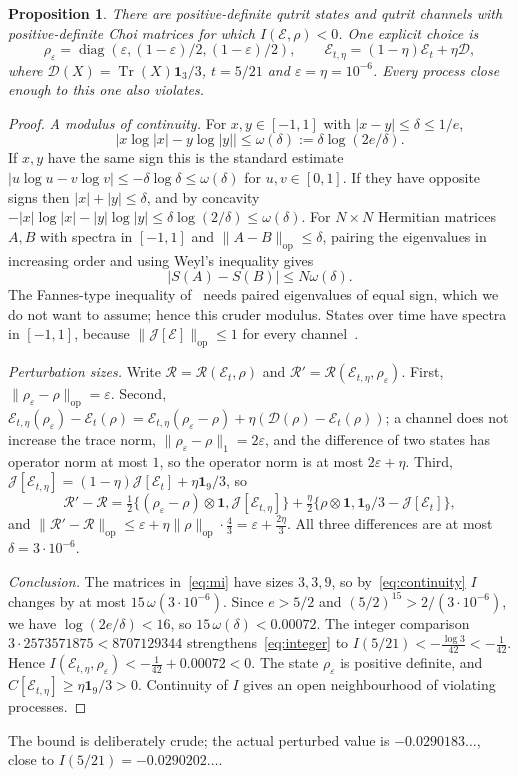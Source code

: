 \documentclass[11pt,a4paper]{article}
\newtheorem{proposition}[theorem]{Proposition}
\theoremstyle{definition}\newtheorem{definition}[theorem]{Definition}
\theoremstyle{remark}\newtheorem{remark}[theorem]{Remark}
\newcommand{\Tr}{\operatorname{Tr}}
\newcommand{\diag}{\operatorname{diag}}
\newcommand{\op}{\mathrm{op}}
\newcommand{\one}{\mathbf{1}}
\newcommand{\E}{\mathcal E}
\newcommand{\R}{\mathcal R}
\newcommand{\J}{\mathcal J}
\begin{document}
\begin{proposition}\label{prop:interior}
There are positive-definite qutrit states and qutrit channels with positive-definite Choi matrices for which $I(\E,\rho)<0$. One explicit choice is
\[
 \rho_\varepsilon=\diag(\varepsilon,(1-\varepsilon)/2,(1-\varepsilon)/2),
 \qquad
 \E_{t,\eta}=(1-\eta)\E_t+\eta\mathcal D,
\]
where $\mathcal D(X)=\Tr(X)\one_3/3$, $t=5/21$ and $\varepsilon=\eta=10^{-6}$. Every process close enough to this one also violates.
\end{proposition}
\begin{proof}
\emph{A modulus of continuity.} For $x,y\in[-1,1]$ with $|x-y|\le\delta\le1/e$,
\[
 \bigl|x\log|x|-y\log|y|\bigr|\le\omega(\delta):=\delta\log(2e/\delta).
\]
If $x,y$ have the same sign this is the standard estimate $|u\log u-v\log v|\le-\delta\log\delta\le\omega(\delta)$ for $u,v\in[0,1]$. If they have opposite signs then $|x|+|y|\le\delta$, and by concavity $-|x|\log|x|-|y|\log|y|\le\delta\log(2/\delta)\le\omega(\delta)$. For $N\times N$ Hermitian matrices $A,B$ with spectra in $[-1,1]$ and $\|A-B\|_\op\le\delta$, pairing the eigenvalues in increasing order and using Weyl's inequality gives
\begin{equation}\label{eq:continuity}
 |S(A)-S(B)|\le N\omega(\delta).
\end{equation}
The Fannes-type inequality of~\cite[Proposition~1]{FP} needs paired eigenvalues of equal sign, which we do not want to assume; hence this cruder modulus. States over time have spectra in $[-1,1]$, because $\|\J[\E]\|_\op\le1$ for every channel~\cite[Lemma~2.7]{FY}.

\emph{Perturbation sizes.} Write $\R=\R(\E_t,\rho)$ and $\R'=\R(\E_{t,\eta},\rho_\varepsilon)$. First, $\|\rho_\varepsilon-\rho\|_\op=\varepsilon$. Second,
$\E_{t,\eta}(\rho_\varepsilon)-\E_t(\rho)=\E_{t,\eta}(\rho_\varepsilon-\rho)+\eta(\mathcal D(\rho)-\E_t(\rho))$; a channel does not increase the trace norm, $\|\rho_\varepsilon-\rho\|_1=2\varepsilon$, and the difference of two states has operator norm at most $1$, so the operator norm is at most $2\varepsilon+\eta$. Third, $\J[\E_{t,\eta}]=(1-\eta)\J[\E_t]+\eta\one_9/3$, so
\[
 \R'-\R=\tfrac12\{(\rho_\varepsilon-\rho)\otimes\one,\J[\E_{t,\eta}]\}+\tfrac\eta2\{\rho\otimes\one,\one_9/3-\J[\E_t]\},
\]
and $\|\R'-\R\|_\op\le\varepsilon+\eta\|\rho\|_\op\cdot\tfrac43=\varepsilon+\tfrac{2\eta}3$. All three differences are at most $\delta=3\cdot10^{-6}$.

\emph{Conclusion.} The matrices in~\eqref{eq:mi} have sizes $3,3,9$, so by~\eqref{eq:continuity} $I$ changes by at most $15\,\omega(3\cdot10^{-6})$. Since $e>5/2$ and $(5/2)^{15}>2/(3\cdot10^{-6})$, we have $\log(2e/\delta)<16$, so $15\,\omega(\delta)<0.00072$. The integer comparison $3\cdot2573571875<8707129344$ strengthens~\eqref{eq:integer} to $I(5/21)<-\tfrac{\log3}{42}<-\tfrac1{42}$. Hence $I(\E_{t,\eta},\rho_\varepsilon)<-\tfrac1{42}+0.00072<0$. The state $\rho_\varepsilon$ is positive definite, and $C[\E_{t,\eta}]\ge\eta\one_9/3>0$. Continuity of $I$ gives an open neighbourhood of violating processes.
\end{proof}
The bound is deliberately crude; the actual perturbed value is $-0.0290183\ldots$, close to $I(5/21)=-0.0290202\ldots$.
\end{document}
